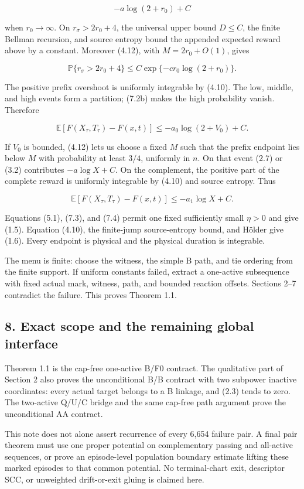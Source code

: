 \[
                         -a\log(2+r_0)+C              \tag{7.2}
\]

when \(r_0\to\infty\). On \(r_\sigma>2r_0+4\), the universal upper bound
\(D\le C\), the finite Bellman recursion, and source entropy bound the
appended expected reward above by a constant. Moreover (4.12), with
\(M=2r_0+O(1)\), gives

\[
 \mathbb P\{r_\sigma>2r_0+4\}
 \le C\exp\{-c r_0\log(2+r_0)\}.                    \tag{7.2b}
\]

The positive prefix overshoot is uniformly integrable by (4.10). The
low, middle, and high events form a partition; (7.2b) makes the high
probability vanish. Therefore

\[
              \mathbb E[F(X_\tau,T_\tau)-F(x,t)]
                 \le-a_0\log(2+V_0)+C.              \tag{7.3}
\]

If \(V_0\) is bounded, (4.12) lets us choose a fixed \(M\) such that the
prefix endpoint lies below \(M\) with probability at least \(3/4\),
uniformly in \(n\). On that event (2.7) or (3.2) contributes
\(-a\log X+C\). On the complement, the positive part of the complete
reward is uniformly integrable by (4.10) and source entropy. Thus

\[
              \mathbb E[F(X_\tau,T_\tau)-F(x,t)]
                 \le-a_1\log X+C.                   \tag{7.4}
\]

Equations (5.1), (7.3), and (7.4) permit one fixed sufficiently small
\(\eta>0\) and give (1.5). Equation (4.10), the finite-jump
source-entropy bound, and Hölder give (1.6). Every endpoint is physical
and the physical duration is integrable.

The menu is finite: choose the witness, the simple B path, and tie
ordering from the finite support. If uniform constants failed, extract a
one-active subsequence with fixed actual mark, witness, path, and
bounded reaction offsets. Sections 2--7 contradict the failure. This
proves Theorem 1.1.

\subsection{8. Exact scope and the remaining global
interface}

Theorem 1.1 is the cap-free one-active B/F0 contract. The qualitative
part of Section 2 also proves the unconditional B/B contract with two
subpower inactive coordinates: every actual target belongs to a B
linkage, and (2.3) tends to zero. The two-active Q/U/C bridge and the
same cap-free path argument prove the unconditional AA contract.

This note does not alone assert recurrence of every 6,654 failure pair.
A final pair theorem must use one proper potential on complementary
passing and all-active sequences, or prove an episode-level population
boundary estimate lifting these marked episodes to that common
potential. No terminal-chart exit, descriptor SCC, or unweighted
drift-or-exit gluing is claimed here.
